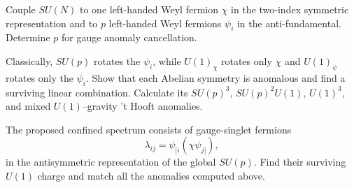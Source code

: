 Couple $SU(N)$ to one left-handed Weyl fermion $\chi$ in the
two-index symmetric representation and to $p$ left-handed Weyl
fermions $\psi_i$ in the anti-fundamental. Determine $p$ for gauge
anomaly cancellation.

Classically, $SU(p)$ rotates the $\psi_i$, while $U(1)_\chi$
rotates only $\chi$ and $U(1)_\psi$ rotates only the $\psi_i$.
Show that each Abelian symmetry is anomalous and find a surviving
linear combination. Calculate its $SU(p)^3$, $SU(p)^2U(1)$,
$U(1)^3$, and mixed $U(1)$--gravity 't Hooft anomalies.

The proposed confined spectrum consists of gauge-singlet fermions
\begin{equation}
    \lambda_{ij}=\psi_{[i}(\chi\psi_{j]}),
\end{equation}
in the antisymmetric representation of the global $SU(p)$.
Find their surviving $U(1)$ charge and match all the anomalies
computed above.

